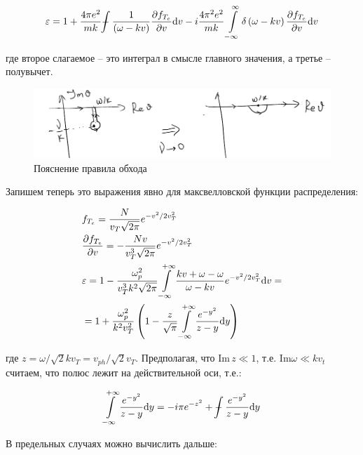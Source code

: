 \documentclass[10pt, a4paper]{article}
\def\Xint#1{\mathchoice
 {\XXint\displaystyle\textstyle{#1}}%
 {\XXint\textstyle\scriptstyle{#1}}%
 {\XXint\scriptstyle\scriptscriptstyle{#1}}%
 {\XXint\scriptscriptstyle\scriptscriptstyle{#1}}%
 \!\int}
\def\XXint#1#2#3{{\setbox0=\hbox{$#1{#2#3}{\int}$}
   \vcenter{\hbox{$#2#3$}}\kern-.5\wd0}}
\def\dashint{\Xint-}
\begin{document}
\begin{equation*}
	\varepsilon = 1 + \frac{4\pi e^2}{mk}\dashint\frac{1}{\left( \omega - kv \right)}\pdv{f_{T_e}}{v}\dd v - i\frac{4\pi^2 e^2}{mk}\int\limits_{-\infty}^{\infty}\delta\left( \omega - kv \right)\pdv{f_{T_e}}{v}\dd v
\end{equation*}

где второе слагаемое -- это интеграл в смысле главного значения, а третье -- полувычет.

\begin{figure}[h!]
	\label{fig.7.pole} 
	\begin{center}
		\includegraphics[width=1\linewidth]{7.pole.pdf}
	\end{center}
	\caption{Пояснение правила обхода}
\end{figure}

Запишем теперь это выражения явно для максвелловской функции распределения:

\begin{align*}
	& f_{T_e} = \frac{N}{v_T\sqrt{2\pi}} e^{-v^2/2 v_T^2} \\
	& \pdv{f_{T_e}}{v} = -\frac{Nv}{v_T^3 \sqrt{2\pi}}e^{-v^2/ 2 v_T^2} \\
	& \varepsilon = 1 - \frac{\omega_p^2}{v_T^3 k^2\sqrt{2\pi}}\int\limits_{-\infty}^{+\infty}\frac{kv + \omega - \omega }{\omega - kv} e^{-v^2/ 2 v_T^2} \dd v = \\
	&= 1 + \frac{\omega_p^2}{k^2 v_T^2} \left( 1 - \frac{z}{\sqrt{\pi}}\int\limits_{-\infty}^{+\infty}\frac{e^{-y^2}}{z-y}\dd y \right)
\end{align*} 

где $z = \omega/\sqrt{2}kv_T = v_{ph}/\sqrt{2}v_T$. Предполагая, что $\text{Im}\,z\ll 1$, т.е. $\text{Im}\omega \ll kv_t$ считаем, что полюс лежит на действительной оси, т.е.:

\begin{equation*}
	\int\limits_{-\infty}^{+\infty}\frac{e^{-y^2}}{z-y}\dd y = -i\pi e^{-z^2} + \dashint\frac{e^{-y^2}}{z-y}\dd y
\end{equation*}

В предельных случаях можно вычислить дальше:
\end{document}
